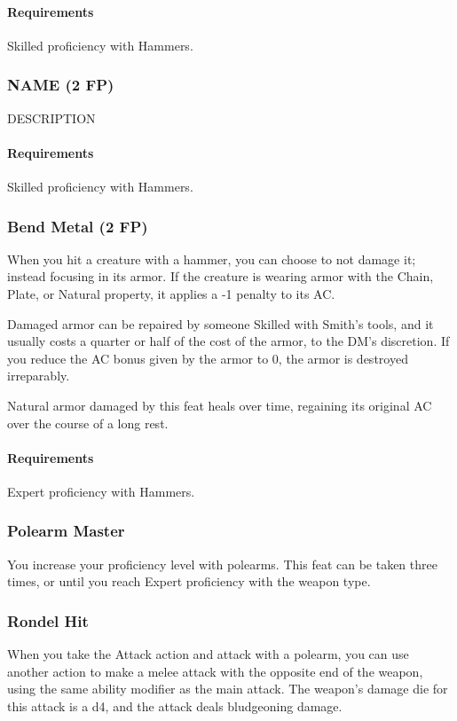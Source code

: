     \paragraph{Requirements} Skilled proficiency with Hammers.
\subsubsection{NAME (2 FP)} \label{feat::name}
    DESCRIPTION
    \paragraph{Requirements} Skilled proficiency with Hammers.
\subsubsection{Bend Metal (2 FP)} \label{feat::bendmetal}
    When you hit a creature with a hammer, you can choose to not damage it; instead focusing in its armor.
    If the creature is wearing armor with the Chain, Plate, or Natural property, it applies a -1 penalty to its AC.

    Damaged armor can be repaired by someone Skilled with Smith's tools, and it usually costs a quarter or half of the cost of the armor, to the DM's discretion.
    If you reduce the AC bonus given by the armor to 0, the armor is destroyed irreparably.

    Natural armor damaged by this feat heals over time, regaining its original AC over the course of a long rest.
    \paragraph{Requirements} Expert proficiency with Hammers.
\subsubsection{Polearm Master} \label{feat::polearmmaster}
    You increase your proficiency level with polearms.
    This feat can be taken three times, or until you reach Expert proficiency with the weapon type.
\subsubsection{Rondel Hit} \label{feat::rondelhit}
    When you take the Attack action and attack with a polearm, you can use another action to make a melee attack with the opposite end of the weapon, using the same ability modifier as the main attack.
    The weapon's damage die for this attack is a d4, and the attack deals bludgeoning damage.

